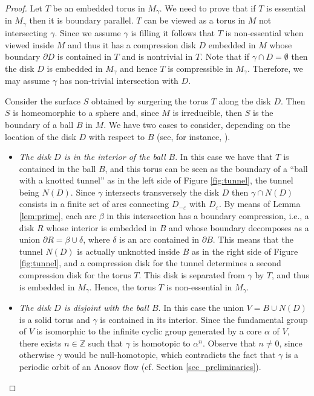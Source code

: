 \documentclass[12pt]{amsart}
\theoremstyle{definition}
\theoremstyle{remark}
\newcommand{\Z}{\mathbb{Z}}
\newcommand{\mg}{M_\gamma}
\begin{document}
\begin{proof}
Let $T$ be an embedded torus in $\mg$. We need to prove that if $T$ is essential in $\mg$ then it is boundary parallel. $T$ can be viewed as a torus in $M$ not intersecting $\gamma$. Since we assume $\gamma$ is filling it follows that $T$ is non-essential when viewed inside $M$ and thus it has a compression disk $D$ embedded in $M$ whose boundary $\partial D$ is contained in $T$ and is nontrivial in $T$. Note that if $\gamma\cap D=\emptyset$ then the disk $D$ is embedded in $\mg$ and hence $T$ is compressible in $\mg$. Therefore, we may assume $\gamma$ has non-trivial intersection with $D$. 


Consider the surface $S$ obtained by surgering the torus $T$ along the disk $D$. 
Then $S$ is homeomorphic to a sphere and, since $M$ is irreducible, then $S$ is the boundary of a ball $B$ in $M$.
We have two cases to consider, depending on the location of the disk $D$ with respect to $B$ (see, for instance, \cite{Hatcher_3mflds}).
\begin{itemize}
    \item[(a)] \emph{The disk $D$ is in the interior of the ball $B$}. In this case we have that $T$ is contained in the ball $B$, and this torus can be seen as the boundary of a ``ball with a knotted tunnel'' as in the left side of Figure \ref{fig:tunnel}, the tunnel being $N(D)$. Since $\gamma$ intersects transversely the disk $D$ then $\gamma\cap N(D)$ consists in a finite set of arcs connecting $D_{-\varepsilon}$ with $D_\varepsilon$. By means of Lemma \ref{lem:prime}, each arc $\beta$ in this intersection has a boundary compression, i.e., a disk $R$ whose interior is embedded in $B$ and whose boundary decomposes as a union $\partial R=\beta\cup\delta$, where $\delta$ is an arc contained in $\partial B$. This means that the tunnel $N(D)$ is actually unknotted inside $B$ as in the right side of Figure \ref{fig:tunnel}, and a compression disk for the tunnel determines a second compression disk for the torus $T$. This disk is separated from $\gamma$ by $T$, and thus is embedded in $\mg$. Hence, the torus $T$ is non-essential in $\mg$.

    \item[(b)] \emph{The disk $D$ is disjoint with the ball $B$}. In this case the union $V=B\cup N(D)$ is a solid torus and $\gamma$ is contained in its interior. Since the fundamental group of $V$ is isomorphic to the infinite cyclic group generated by a core $\alpha$ of $V$, there exists $n\in\Z$ such that $\gamma$ is homotopic to $\alpha^n$. Observe that $n\neq 0$, since otherwise $\gamma$ would be null-homotopic, which contradicts the fact that $\gamma$ is a periodic orbit of an Anosov flow (cf. Section \ref{sec_preliminaries}). 


\end{itemize}
\end{proof}
\end{document}
